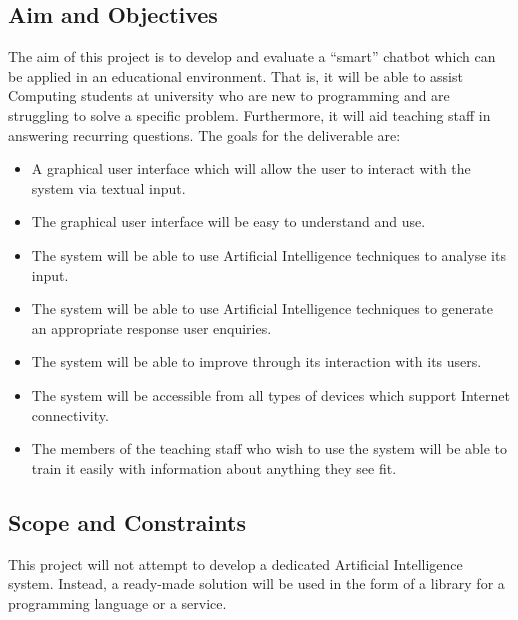 \documentclass[12pt,a4paper]{article}
\begin{document}
\subsection{Aim and Objectives}\label{subsec:aims}
The aim of this project is to develop and evaluate a \enquote{smart} chatbot which can be applied in an educational environment. That is, it will be able to assist Computing students at university who are new to programming and are struggling to solve a specific problem. Furthermore, it will aid teaching staff in answering recurring questions. The goals for the deliverable are:
\begin{itemize}
	\item A graphical user interface which will allow the user to interact with the system via textual input.
	\item The graphical user interface will be easy to understand and use. 
	\item The system will be able to use Artificial Intelligence techniques to analyse its input.
	\item The system will be able to use Artificial Intelligence techniques to generate an appropriate response user enquiries.
	\item The system will be able to improve through its interaction with its users.
	\item The system will be accessible from all types of devices which support Internet connectivity.
	\item The members of the teaching staff who wish to use the system will be able to train it easily with information about anything they see fit.
\end{itemize}

\subsection{Scope and Constraints}
This project will not attempt to develop a dedicated Artificial Intelligence system. Instead, a ready-made solution will be used in the form of a library for a programming language or a service. 
\end{document}
